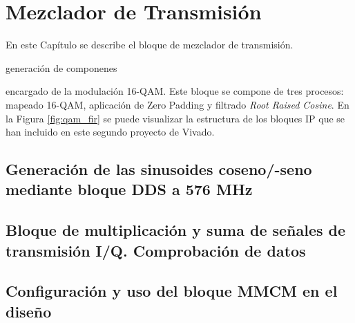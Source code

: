 \chapter{Mezclador de Transmisión}
\label{section:mezcla}

En este Capítulo se describe el bloque de mezclador de transmisión.

generación de componenes


encargado de la modulación 16-QAM. Este bloque se compone de tres procesos: mapeado 16-QAM, aplicación de Zero Padding y filtrado \textit{Root Raised Cosine}. En la Figura \ref{fig:qam_fir} se puede visualizar la estructura de los bloques IP que se han incluido en este segundo proyecto de Vivado. 



\section{Generación de las sinusoides coseno/-seno mediante bloque DDS a 576 MHz}



\section{Bloque de multiplicación y suma de señales de transmisión I/Q. Comprobación de datos}



\section{Configuración y uso del bloque MMCM en el diseño}






